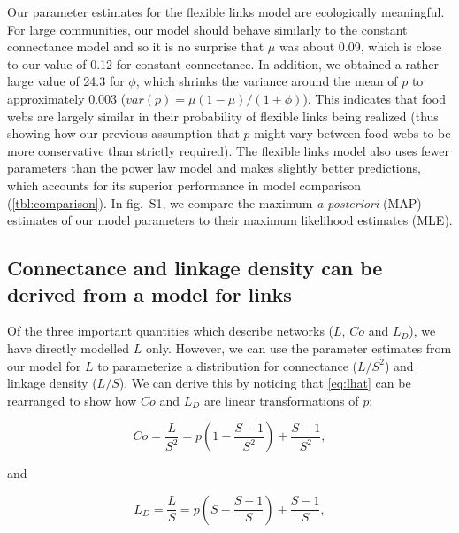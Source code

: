 \documentclass[12pt]{article}
\begin{document}
Our parameter estimates for the flexible links model are ecologically
meaningful. For large communities, our model should behave similarly to
the constant connectance model and so it is no surprise that \(\mu\) was
about 0.09, which is close to our value of 0.12 for constant
connectance. In addition, we obtained a rather large value of 24.3 for
\(\phi\), which shrinks the variance around the mean of \(p\) to
approximately 0.003 (\(var(p)=\mu(1-\mu)/(1+\phi)\)). This indicates
that food webs are largely similar in their probability of flexible
links being realized (thus showing how our previous assumption that
\(p\) might vary between food webs to be more conservative than strictly
required). The flexible links model also uses fewer parameters than the
power law model and makes slightly better predictions, which accounts
for its superior performance in model comparison
(\cref{tbl:comparison}). In fig.~S1, we compare the maximum \emph{a
posteriori} (MAP) estimates of our model parameters to their maximum
likelihood estimates (MLE).

\hypertarget{connectance-and-linkage-density-can-be-derived-from-a-model-for-links}{%
\subsection{Connectance and linkage density can be derived from a model
for
links}\label{connectance-and-linkage-density-can-be-derived-from-a-model-for-links}}

Of the three important quantities which describe networks (\(L\), \(Co\)
and \(L_D\)), we have directly modelled \(L\) only. However, we can use
the parameter estimates from our model for \(L\) to parameterize a
distribution for connectance (\(L/S^2\)) and linkage density (\(L/S\)).
We can derive this by noticing that \cref{eq:lhat} can be rearranged to
show how \(Co\) and \(L_D\) are linear transformations of \(p\):

\begin{equation} Co = \frac{L}{S^2} = p\left(1 - \frac{S-1}{S^2}\right) + \frac{S-1}{S^2} ,\label{eq:co}\end{equation}

and

\begin{equation} L_D = \frac{L}{S} = p \left(S - \frac{S-1}{S} \right) +  \frac{S-1}{S},\label{eq:ld}\end{equation}
\end{document}
